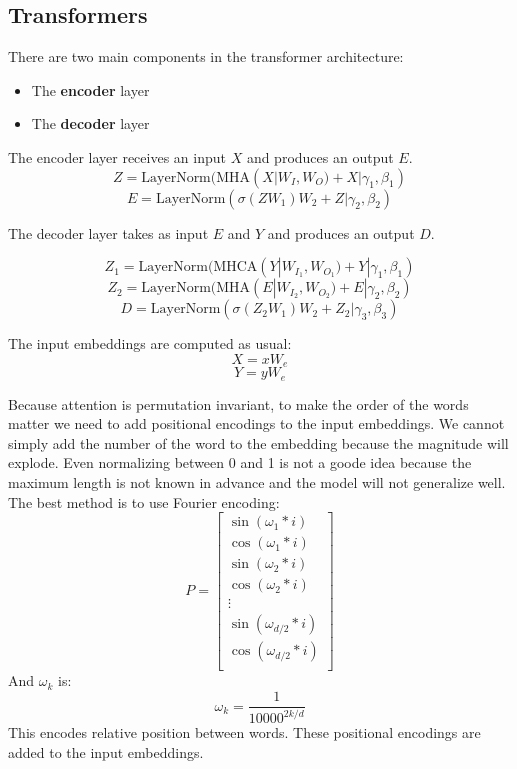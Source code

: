 \subsection{Transformers}
\label{sec:transformers}

There are two main components in the transformer architecture:
\begin{itemize}
    \item The \textbf{encoder} layer
    \item The \textbf{decoder} layer
\end{itemize}

The encoder layer receives an input $X$ and produces an output $E$.
\[
    Z=\text{LayerNorm}(\text{MHA}(X|W_I,W_O)+X|\gamma_1,\beta_1)
\]
\[
    E=\text{LayerNorm}(\sigma(ZW_1)W_2+Z|\gamma_2,\beta_2)
\]

The decoder layer takes as input $E$ and $Y$ and produces an output $D$.

\[
    Z_1=\text{LayerNorm}(\text{MHCA}(Y|W_{I_1},W_{O_1})+Y|\gamma_1,\beta_1)
\]
\[
    Z_2=\text{LayerNorm}(\text{MHA}(E|W_{I_2},W_{O_2})+E|\gamma_2,\beta_2)
\]
\[
    D=\text{LayerNorm}(\sigma(Z_2W_1)W_2+Z_2|\gamma_3,\beta_3)
\]

The input embeddings are computed as usual:
\[
    X=xW_e
\]
\[
    Y=yW_e
\]

Because attention is permutation invariant, to make the order of the words matter we need to add positional encodings to the input embeddings.
We cannot simply add the number of the word to the embedding because the magnitude will explode.
Even normalizing between 0 and 1 is not a goode idea because the maximum length is not
known in advance and the model will not generalize well.
The best method is to use Fourier encoding:
\[
    P=\begin{bmatrix}
        \sin(\omega_1*i) \\
        \cos(\omega_1*i) \\
        \sin(\omega_2*i) \\
        \cos(\omega_2*i) \\
        \vdots \\
        \sin(\omega_{d/2}*i) \\
        \cos(\omega_{d/2}*i) \\
    \end{bmatrix}
\]
And $\omega_k$ is:
\[
    \omega_k=\frac{1}{10000^{2k/d}}
\]
This encodes relative position between words.
These positional encodings are added to the input embeddings.

